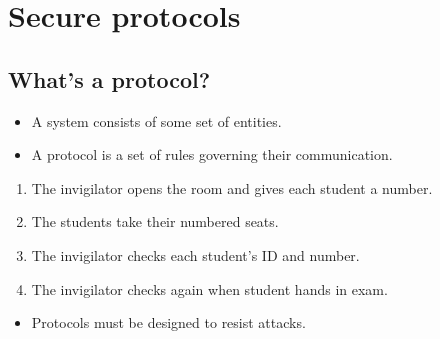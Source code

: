\mode*




\section{Secure protocols}

\subsection{What's a protocol?}

\begin{frame}
  \begin{definition}[Protocol]
    \begin{itemize}
      \item A system consists of some set of entities.
      \item A protocol is a set of rules governing their communication.
    \end{itemize}
  \end{definition}

  \pause

  \begin{example}[Exam]
    \begin{enumerate}
      \item The invigilator opens the room and gives each student a number.
      \item The students take their numbered seats.
      \item The invigilator checks each student's ID and number.
      \item The invigilator checks again when student hands in exam.
    \end{enumerate}
  \end{example}
\end{frame}

\begin{frame}
  \begin{remark}
    \begin{itemize}
      \item Protocols must be designed to resist attacks.
    \end{itemize}
  \end{remark}
\end{frame}

